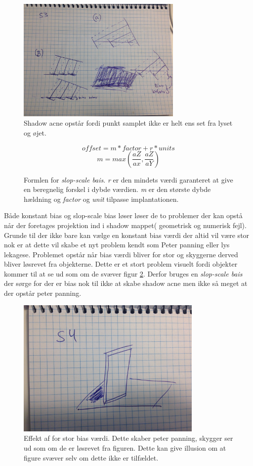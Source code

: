 \documentclass[11pt,a4paper]{article}
\begin{document}
\begin{figure}[ht!]
\centering
\includegraphics[width=80mm]{img/S3.jpg}
\caption{Shadow acne opstår fordi punkt samplet ikke er helt ens set fra lyset og øjet.}
\label{S3}
\end{figure}


\begin{figure}
\[ offset = m * factor + r * units \] 
\[ m = max(\frac{aZ}{ax},\frac{aZ}{aY})\]
\caption{Formlen for \textit{slop-scale bais}. \textit{r} er den mindets værdi garanteret at give en beregnelig forskel i dybde værdien. \textit{m} er den største dybde hældning  og \textit{factor} og \textit{unit} tilpasse implantationen.}
\end{figure}


Både konstant bias og slop-scale bias løser løser de to problemer der kan opstå når der foretages projektion ind i shadow mappet( geometrisk og numerisk fejl). Grunde til der ikke bare kan vælge en konstant bias værdi der altid vil være stor nok er at dette vil skabe et nyt problem kendt som Peter panning eller lys lekagese. Problemet opstår når bias værdi bliver for stor og skyggerne derved bliver løsrevet fra objekterne. Dette er et stort problem visuelt fordi objekter kommer til at se ud som om de svæver figur \ref{S4}. Derfor bruges en \textit{slop-scale bais} der sørge for der er bias nok til ikke at skabe shadow acne men ikke så meget at der opstår peter panning.

\begin{figure}[ht!]
\centering
\includegraphics[width=90mm]{img/S4.jpg}
\caption{Effekt af for stor bias værdi. Dette skaber peter panning, skygger ser ud som om de er løsrevet fra figuren. Dette kan give illusion om at figure svæver selv om dette ikke er tilfældet.}
\label{S4}
\end{figure}
\end{document}
